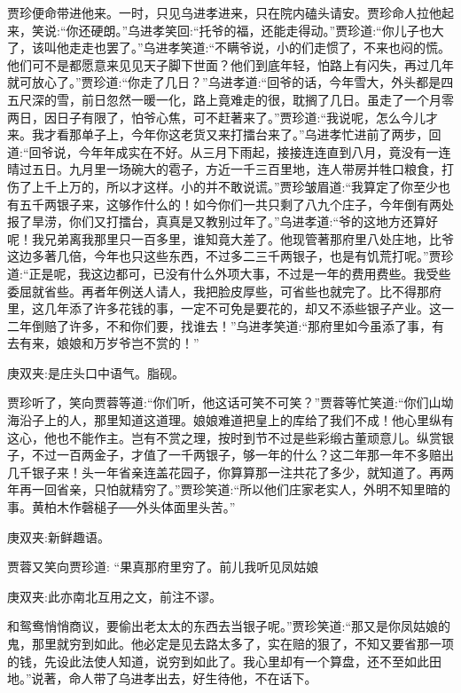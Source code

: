 \begin{parag}
    贾珍便命带进他来。一时，只见乌进孝进来，只在院内磕头请安。贾珍命人拉他起来，笑说:“你还硬朗。”乌进孝笑回:“托爷的福，还能走得动。”贾珍道:“你儿子也大了，该叫他走走也罢了。”乌进孝笑道:“不瞒爷说，小的们走惯了，不来也闷的慌。他们可不是都愿意来见见天子脚下世面？他们到底年轻，怕路上有闪失，再过几年就可放心了。”贾珍道:“你走了几日？”乌进孝道:“回爷的话，今年雪大，外头都是四五尺深的雪，前日忽然一暖一化，路上竟难走的很，耽搁了几日。虽走了一个月零两日，因日子有限了，怕爷心焦，可不赶著来了。”贾珍道:“我说呢，怎么今儿才来。我才看那单子上，今年你这老货又来打擂台来了。”乌进孝忙进前了两步，回道:“回爷说，今年年成实在不好。从三月下雨起，接接连连直到八月，竟没有一连晴过五日。九月里一场碗大的雹子，方近一千三百里地，连人带房并牲口粮食，打伤了上千上万的，所以才这样。小的并不敢说谎。”贾珍皱眉道:“我算定了你至少也有五千两银子来，这够作什么的！如今你们一共只剩了八九个庄子，今年倒有两处报了旱涝，你们又打擂台，真真是又教别过年了。”乌进孝道:“爷的这地方还算好呢！我兄弟离我那里只一百多里，谁知竟大差了。他现管著那府里八处庄地，比爷这边多著几倍，今年也只这些东西，不过多二三千两银子，也是有饥荒打呢。”贾珍道:“正是呢，我这边都可，已没有什么外项大事，不过是一年的费用费些。我受些委屈就省些。再者年例送人请人，我把脸皮厚些，可省些也就完了。比不得那府里，这几年添了许多花钱的事，一定不可免是要花的，却又不添些银子产业。这一二年倒赔了许多，不和你们要，找谁去！”乌进孝笑道:“那府里如今虽添了事，有去有来，娘娘和万岁爷岂不赏的！”\begin{note}庚双夹:是庄头口中语气。脂砚。\end{note}贾珍听了，笑向贾蓉等道:“你们听，他这话可笑不可笑？”贾蓉等忙笑道:“你们山坳海沿子上的人，那里知道这道理。娘娘难道把皇上的库给了我们不成！他心里纵有这心，他也不能作主。岂有不赏之理，按时到节不过是些彩缎古董顽意儿。纵赏银子，不过一百两金子，才值了一千两银子，够一年的什么？这二年那一年不多赔出几千银子来！头一年省亲连盖花园子，你算算那一注共花了多少，就知道了。再两年再一回省亲，只怕就精穷了。”贾珍笑道:“所以他们庄家老实人，外明不知里暗的事。黄柏木作磬槌子──外头体面里头苦。”\begin{note}庚双夹:新鲜趣语。\end{note}贾蓉又笑向贾珍道: “果真那府里穷了。前儿我听见凤姑娘\begin{note}庚双夹:此亦南北互用之文，前注不谬。\end{note}和鸳鸯悄悄商议，要偷出老太太的东西去当银子呢。”贾珍笑道:“那又是你凤姑娘的鬼，那里就穷到如此。他必定是见去路太多了，实在赔的狠了，不知又要省那一项的钱，先设此法使人知道，说穷到如此了。我心里却有一个算盘，还不至如此田地。”说著，命人带了乌进孝出去，好生待他，不在话下。
\end{parag}


